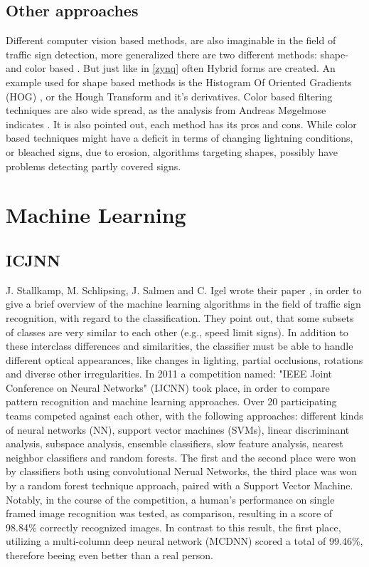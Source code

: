 \subsection{Other approaches}
Different computer vision based methods, are also imaginable in the field of traffic sign detection, more generalized there are two different methods: shape- and color based \cite{moglemose}. But just like in \ref{zynq} often Hybrid forms are created. An example used for shape based methods is the Histogram Of Oriented Gradients (HOG) \cite{hogex}, or the Hough Transform and it's derivatives. Color based filtering techniques are also wide spread, as the analysis from Andreas Møgelmose indicates \cite{moglemose}. 
It is also pointed out, each method has its pros and cons. While color based techniques might have a deficit in terms of changing lightning conditions, or bleached signs, due to erosion, algorithms targeting shapes, possibly have problems detecting partly covered signs. 


\section{Machine Learning}
\subsection{ICJNN}\label{ssec:machinelearning}

J. Stallkamp, M. Schlipsing, J. Salmen and C. Igel wrote their paper \cite{machinelearning}, in order to give a brief overview of the machine learning algorithms in the field of traffic sign recognition, with regard to the classification. \newline
They point out, that some subsets of classes are
very similar to each other (e.g., speed limit signs). In addition to these interclass differences and similarities, the classifier must be able to handle different optical appearances, like changes in lighting, partial occlusions, rotations and diverse other irregularities. In 2011 a competition named: "IEEE Joint
Conference on Neural Networks" (IJCNN) \cite{ijcnn} took place, in order to compare pattern recognition and machine learning approaches. Over 20 participating teams competed against each other, with the following approaches: different kinds of neural
networks (NN), support vector machines (SVMs), linear discriminant analysis, subspace analysis, ensemble classifiers, slow feature analysis, nearest neighbor classifiers and random forests. \newline
The first and the second place were won by classifiers both using convolutional Nerual Networks, the third place was won by a random forest technique approach, paired with a Support Vector Machine. Notably, in the course of the competition, a human's performance on single framed image recognition was tested, as comparison, resulting in a score of 98.84\% correctly recognized images. In contrast to this result, the first place, utilizing a multi-column deep neural network (MCDNN) scored a total of 99.46\%, therefore beeing even better than a real person. 


